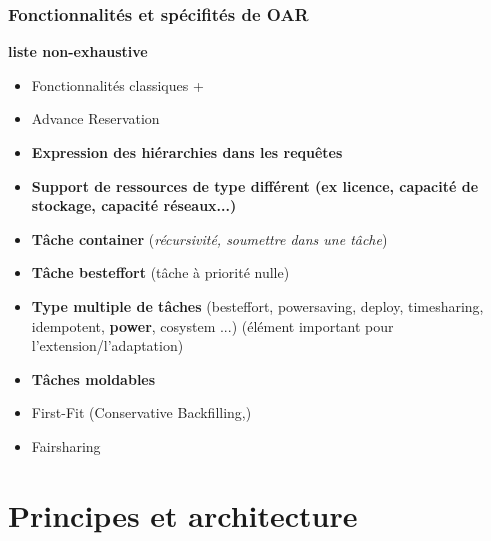 \documentclass{beamer}
\begin{document}
\begin{frame}
\frametitle{Fonctionnalités et spécifités de OAR}
	{\bf liste non-exhaustive}
		\begin{itemize}
    \item Fonctionnalités classiques +
    \item Advance Reservation
		\item {\bf Expression des hiérarchies dans les requêtes }
		\item {\bf Support de ressources de type différent (ex licence, capacité de stockage, capacité réseaux...)  }
		\item {\bf Tâche container} ({\em récursivité, soumettre dans une tâche})
		\item {\bf Tâche besteffort} (tâche à priorité nulle)
		\item {\bf Type multiple de tâches} (besteffort, powersaving, deploy, timesharing, idempotent, {\bf power}, cosystem ...) (élément important pour l'extension/l'adaptation)
    \item {\bf Tâches moldables}
		\item First-Fit (Conservative Backfilling,)
		\item Fairsharing 
		
	\end{itemize}
\end{frame}




\section{Principes et architecture}
\end{document}
